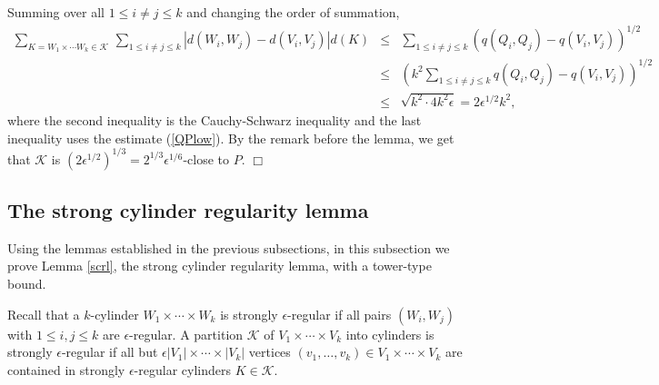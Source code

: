 \documentclass[11pt]{article}
\newenvironment{proof}
      {\medskip\noindent{\bf Proof:}\hspace{1mm}}
      {\hfill$\Box$\medskip}
\begin{document}
\begin{proof}
Summing over all $1 \leq i \not = j \leq k$ and changing the order of summation,
\begin{eqnarray*}\sum_{K=W_1 \times \cdots W_k \in \mathcal{K}} \, \sum_{1 \leq
i \not = j \leq k}  \left|d(W_i,W_j)-d(V_i,V_j)\right|d(K) & \leq &  \sum_{1 \leq i \not = j
\leq k} \left(q(Q_i,Q_j)-q(V_i,V_j)\right)^{1/2} \\ & \leq & \left(k^2\sum_{1
\leq i \not = j \leq k} q(Q_i,Q_j)-q(V_i,V_j)\right)^{1/2} \\ & \leq & \sqrt{k^2 \cdot
4k^2\epsilon}=2\epsilon^{1/2} k^2,\end{eqnarray*}
where the second inequality is the Cauchy-Schwarz inequality and the last
inequality uses the estimate (\ref{QPlow}).
By the remark before the lemma, we get that $\mathcal{K}$ is
$\left(2\epsilon^{1/2}\right)^{1/3}=2^{1/3}\epsilon^{1/6}$-close to $P$.
\end{proof}


\subsection{The strong cylinder regularity lemma} \label{inducedsub3}


Using the lemmas established in the previous subsections, in this subsection we
prove Lemma \ref{scrl}, the strong cylinder regularity lemma, with a tower-type
bound.

Recall that a $k$-cylinder $W_1 \times \cdots \times W_k$ is strongly
$\epsilon$-regular if all pairs $(W_i,W_j)$ with $1 \leq i,j \leq k$ are
$\epsilon$-regular. A partition $\mathcal{K}$ of $V_1 \times \cdots \times V_k$
into cylinders is strongly $\epsilon$-regular if all but $\epsilon|V_1| \times
\cdots \times |V_k|$ vertices $(v_1,\ldots,v_k) \in V_1 \times \cdots \times
V_k$ are contained in strongly $\epsilon$-regular cylinders $K \in
\mathcal{K}$.
\end{document}
